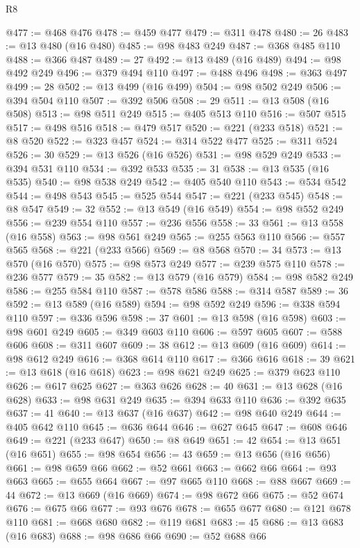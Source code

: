 \begin{lexlean}{R8}
\begin{coremodule}
@477 := @468 @476
@478 := @459 @477
@479 := @311 @478
@480 := 26
@483 := @13 @480 (@16 @480)
@485 := @98 @483 @249
@487 := @368 @485 @110
@488 := @366 @487
@489 := 27
@492 := @13 @489 (@16 @489)
@494 := @98 @492 @249
@496 := @379 @494 @110
@497 := @488 @496
@498 := @363 @497
@499 := 28
@502 := @13 @499 (@16 @499)
@504 := @98 @502 @249
@506 := @394 @504 @110
@507 := @392 @506
@508 := 29
@511 := @13 @508 (@16 @508)
@513 := @98 @511 @249
@515 := @405 @513 @110
@516 := @507 @515
@517 := @498 @516
@518 := @479 @517
@520 := @221 (@233 @518)
@521 := @8 @520
@522 := @323 @457
@524 := @314 @522 @477
@525 := @311 @524
@526 := 30
@529 := @13 @526 (@16 @526)
@531 := @98 @529 @249
@533 := @394 @531 @110
@534 := @392 @533
@535 := 31
@538 := @13 @535 (@16 @535)
@540 := @98 @538 @249
@542 := @405 @540 @110
@543 := @534 @542
@544 := @498 @543
@545 := @525 @544
@547 := @221 (@233 @545)
@548 := @8 @547
@549 := 32
@552 := @13 @549 (@16 @549)
@554 := @98 @552 @249
@556 := @239 @554 @110
@557 := @236 @556
@558 := 33
@561 := @13 @558 (@16 @558)
@563 := @98 @561 @249
@565 := @255 @563 @110
@566 := @557 @565
@568 := @221 (@233 @566)
@569 := @8 @568
@570 := 34
@573 := @13 @570 (@16 @570)
@575 := @98 @573 @249
@577 := @239 @575 @110
@578 := @236 @577
@579 := 35
@582 := @13 @579 (@16 @579)
@584 := @98 @582 @249
@586 := @255 @584 @110
@587 := @578 @586
@588 := @314 @587
@589 := 36
@592 := @13 @589 (@16 @589)
@594 := @98 @592 @249
@596 := @338 @594 @110
@597 := @336 @596
@598 := 37
@601 := @13 @598 (@16 @598)
@603 := @98 @601 @249
@605 := @349 @603 @110
@606 := @597 @605
@607 := @588 @606
@608 := @311 @607
@609 := 38
@612 := @13 @609 (@16 @609)
@614 := @98 @612 @249
@616 := @368 @614 @110
@617 := @366 @616
@618 := 39
@621 := @13 @618 (@16 @618)
@623 := @98 @621 @249
@625 := @379 @623 @110
@626 := @617 @625
@627 := @363 @626
@628 := 40
@631 := @13 @628 (@16 @628)
@633 := @98 @631 @249
@635 := @394 @633 @110
@636 := @392 @635
@637 := 41
@640 := @13 @637 (@16 @637)
@642 := @98 @640 @249
@644 := @405 @642 @110
@645 := @636 @644
@646 := @627 @645
@647 := @608 @646
@649 := @221 (@233 @647)
@650 := @8 @649
@651 := 42
@654 := @13 @651 (@16 @651)
@655 := @98 @654
@656 := 43
@659 := @13 @656 (@16 @656)
@661 := @98 @659 @66
@662 := @52 @661
@663 := @662 @66
@664 := @93 @663
@665 := @655 @664
@667 := @97 @665 @110
@668 := @88 @667
@669 := 44
@672 := @13 @669 (@16 @669)
@674 := @98 @672 @66
@675 := @52 @674
@676 := @675 @66
@677 := @93 @676
@678 := @655 @677
@680 := @121 @678 @110
@681 := @668 @680
@682 := @119 @681
@683 := 45
@686 := @13 @683 (@16 @683)
@688 := @98 @686 @66
@690 := @52 @688 @66

\end{coremodule}
\end{lexlean}
